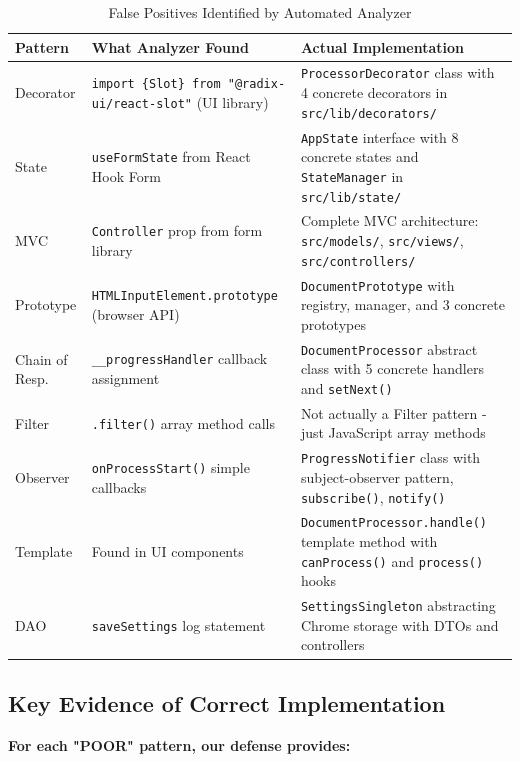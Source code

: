 \documentclass[11pt]{article}
\begin{document}
\begin{table}[H]
\centering
\caption{False Positives Identified by Automated Analyzer}
\begin{tabular}{|l|p{5cm}|p{6cm}|}
\hline
\textbf{Pattern} & \textbf{What Analyzer Found} & \textbf{Actual Implementation} \\
\hline
\hline
Decorator & \texttt{import \{Slot\} from "@radix-ui/react-slot"} (UI library) & \texttt{ProcessorDecorator} class with 4 concrete decorators in \texttt{src/lib/decorators/} \\
\hline
State & \texttt{useFormState} from React Hook Form & \texttt{AppState} interface with 8 concrete states and \texttt{StateManager} in \texttt{src/lib/state/} \\
\hline
MVC & \texttt{Controller} prop from form library & Complete MVC architecture: \texttt{src/models/}, \texttt{src/views/}, \texttt{src/controllers/} \\
\hline
Prototype & \texttt{HTMLInputElement.prototype} (browser API) & \texttt{DocumentPrototype} with registry, manager, and 3 concrete prototypes \\
\hline
Chain of Resp. & \texttt{\_\_progressHandler} callback assignment & \texttt{DocumentProcessor} abstract class with 5 concrete handlers and \texttt{setNext()} \\
\hline
Filter & \texttt{.filter()} array method calls & Not actually a Filter pattern - just JavaScript array methods \\
\hline
Observer & \texttt{onProcessStart()} simple callbacks & \texttt{ProgressNotifier} class with subject-observer pattern, \texttt{subscribe()}, \texttt{notify()} \\
\hline
Template & Found in UI components & \texttt{DocumentProcessor.handle()} template method with \texttt{canProcess()} and \texttt{process()} hooks \\
\hline
DAO & \texttt{saveSettings} log statement & \texttt{SettingsSingleton} abstracting Chrome storage with DTOs and controllers \\
\hline
\end{tabular}
\end{table}

\subsection{Key Evidence of Correct Implementation}

\textbf{For each "POOR" pattern, our defense provides:}
\end{document}
